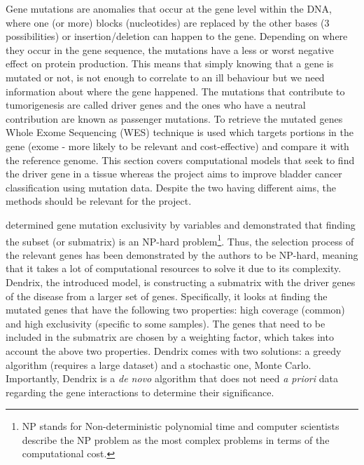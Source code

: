 \vspace{3mm}
\vspace{3mm}


Gene mutations are anomalies that occur at the gene level within the DNA, where one (or more) blocks (nucleotides) are replaced by the other bases (3 possibilities) or insertion/deletion can happen to the gene. Depending on where they occur in the gene sequence, the mutations have a less or worst negative effect on protein production. This means that simply knowing that a gene is mutated or not, is not enough to correlate to an ill behaviour but we need information about where the gene happened. The mutations that contribute to tumorigenesis are called driver genes and the ones who have a neutral contribution are known as passenger mutations\cite{Ciriello2012-hi}. To retrieve the mutated genes Whole Exome Sequencing (WES) technique is used which targets portions in the gene (exome - more likely to be relevant and cost-effective) and compare it with the reference genome\cite{Schneider2016-ml}. This section covers computational models that seek to find the driver gene in a tissue whereas the project aims to improve bladder cancer classification using mutation data. Despite the two having different aims, the methods should be relevant for the project.

  \citet{Vandin2012-cf} determined gene mutation exclusivity by variables and demonstrated that finding the subset (or submatrix) is an NP-hard problem\footnote{ NP stands for Non-deterministic polynomial time and computer scientists describe the NP problem as the most complex problems in terms of the computational cost.}. Thus, the selection process of the relevant genes has been demonstrated by the authors to be NP-hard, meaning that it takes a lot of computational resources to solve it due to its complexity.
   Dendrix, the introduced model, is constructing a submatrix with the driver genes of the disease from a larger set of genes. Specifically, it looks at finding the mutated genes that have the following two properties: high coverage (common) and high exclusivity (specific to some samples). The genes that need to be included in the submatrix are chosen by a weighting factor, which takes into account the above two properties. Dendrix comes with two solutions: a greedy algorithm (requires a large dataset) and a stochastic one, Monte Carlo. Importantly, Dendrix is a \textit{de novo} algorithm that does not need \textit{a priori} data regarding the gene interactions to determine their significance.

